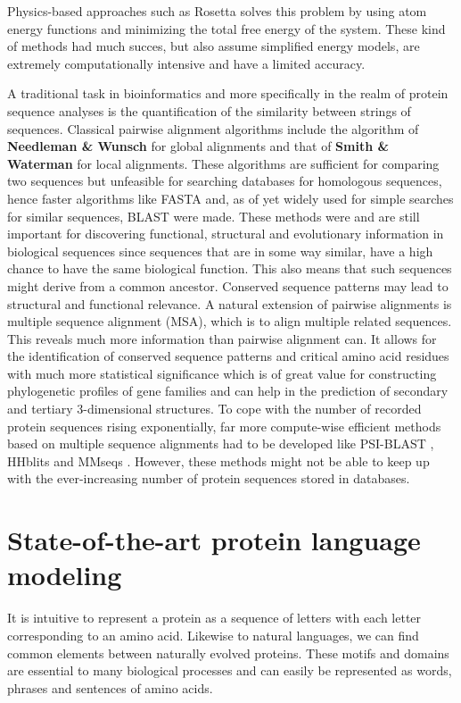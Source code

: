 Physics-based approaches such as Rosetta \cite{rosetta} solves this problem by using atom energy functions and minimizing the total free energy of the system. These kind of methods had much succes, but also assume simplified energy models, are extremely computationally intensive and have a limited accuracy.\cite{review}

A traditional task in bioinformatics and more specifically in the realm of protein sequence analyses is the quantification of the similarity between strings of sequences. Classical pairwise alignment algorithms include the algorithm of \textbf{Needleman \& Wunsch} \cite{global} for global alignments and that of \textbf{Smith \& Waterman} \cite{local} for local alignments. These algorithms are sufficient for comparing two sequences but unfeasible for searching databases for homologous sequences, hence faster algorithms like FASTA \cite{fasta} and, as of yet widely used for simple searches for similar sequences, BLAST \cite{blast} were made. These methods were and are still important for discovering functional, structural and evolutionary information in biological sequences since sequences that are in some way similar, have a high chance to have the same biological function. This also means that such sequences might derive from a common ancestor. Conserved sequence patterns may lead to structural and functional relevance. A natural extension of pairwise alignments is multiple sequence alignment (MSA), which is to align multiple related sequences. This reveals much more information than pairwise alignment can. It allows for the identification of conserved sequence patterns and critical amino acid residues with much more statistical significance which is of great value for constructing phylogenetic profiles of gene families and can help in the prediction of secondary and tertiary 3-dimensional structures. To cope with the number of recorded protein sequences rising exponentially, far more compute-wise efficient methods based on multiple sequence alignments had to be developed like PSI-BLAST \cite{psiblast}, HHblits \cite{hhblits3} and MMseqs \cite{mmseqs2}. However, these methods might not be able to keep up with the ever-increasing number of protein sequences stored in databases.

\section{State-of-the-art protein language modeling}
It is intuitive to represent a protein as a sequence of letters with each letter corresponding to an amino acid. Likewise to natural languages, we can find common elements between naturally evolved proteins. These motifs and domains are essential to many biological processes and can easily be represented as words, phrases and sentences of amino acids.